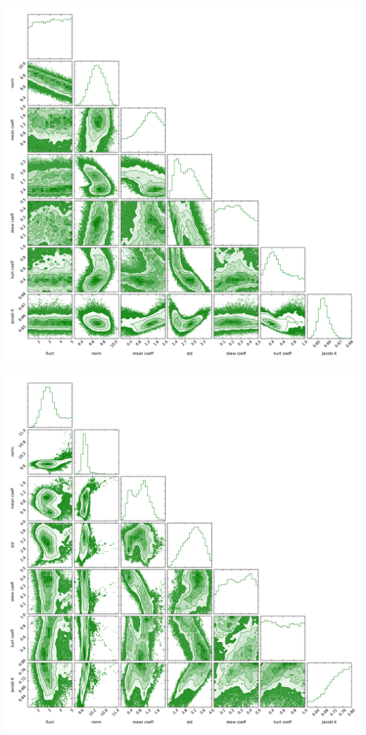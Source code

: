 \documentclass[aps,prl,twocolumn,groupedaddress]{revtex4-1}
\begin{document}
	\includegraphics[width=\columnwidth]{pics/corner-PbPb.pdf}
	
	\includegraphics[width=\columnwidth]{pics/corner-pPb.pdf}		
	
\end{document}

